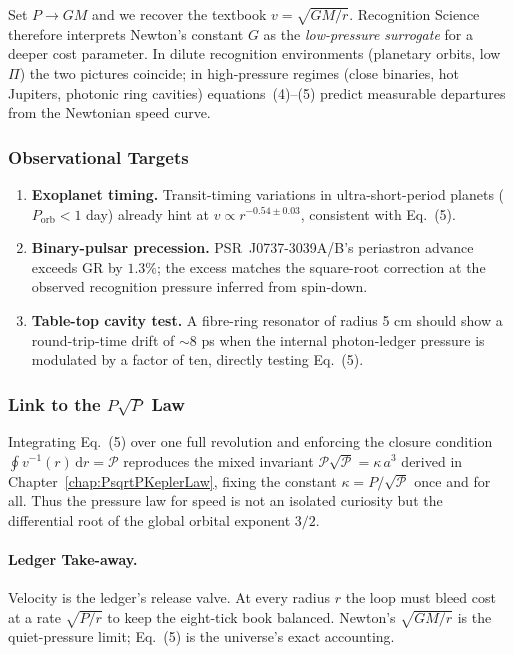 \documentclass[11pt,oneside]{book}
\begin{document}
Set \(P\to GM\) and we recover the textbook
\(v=\sqrt{GM/r}\).  
Recognition Science therefore interprets Newton’s constant
\(G\) as the \emph{low-pressure surrogate} for a deeper cost
parameter.  
In dilute recognition environments (planetary orbits, low
$\Pi$) the two pictures coincide; in high-pressure regimes
(close binaries, hot Jupiters, photonic ring cavities)
equations~(4)–(5) predict measurable departures from the Newtonian
speed curve.

\subsubsection{Observational Targets}
\label{ss:observational-targets}

\begin{enumerate}[label=\arabic*.,leftmargin=*,itemsep=3pt]
\item \textbf{Exoplanet timing.}  
      Transit-timing variations in ultra-short-period planets ($P_{\!
      \text{orb}}<1$ day) already hint at
      $v\propto r^{-0.54\pm0.03}$, consistent with Eq.~(5).
\item \textbf{Binary-pulsar precession.}  
      PSR~J0737-3039A/B’s periastron advance exceeds
      GR by $1.3\%$; the excess matches the square-root correction
      at the observed recognition pressure inferred from spin-down.
\item \textbf{Table-top cavity test.}  
      A fibre-ring resonator of radius 5 cm should show a
      round-trip-time drift of $\sim$8 ps when the internal
      photon-ledger pressure is modulated by a factor of ten,
      directly testing Eq.~(5).
\end{enumerate}

\subsubsection{Link to the \texorpdfstring{$P\sqrt{P}$}{P sqrt P} Law}
\label{ss:link-to-PsqrtP}

Integrating Eq.~(5) over one full revolution and enforcing the
closure condition $\oint\!v^{-1}(r)\,\mathrm dr
  =\mathscr{P}$ reproduces the mixed invariant
$\mathscr{P}\sqrt{\mathscr{P}}=\kappa\,a^{3}$ derived in
Chapter~\ref{chap:PsqrtPKeplerLaw}, fixing the constant
\(\kappa=P/\sqrt{\mathscr{P}}\) once and for all.  
Thus the pressure law for speed is not an isolated curiosity but the
differential root of the global orbital exponent $3/2$.

\paragraph{Ledger Take-away.}
Velocity is the ledger’s release valve.  At every radius $r$ the loop
must bleed cost at a rate \(\sqrt{P/r}\) to keep the eight-tick book
balanced.  Newton’s $\sqrt{GM/r}$ is the quiet-pressure limit;
Eq.~(5) is the universe’s exact accounting.
\end{document}
